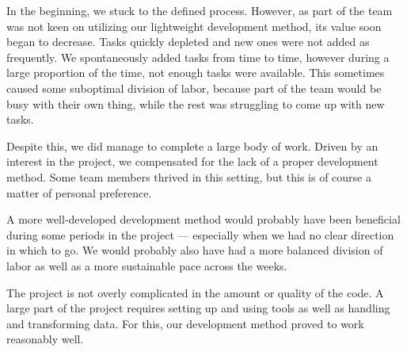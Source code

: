 In the beginning, we stuck to the defined process. However, as part of the team was not keen on utilizing our lightweight development method, its value soon began to decrease. Tasks quickly depleted and new ones were not added as frequently. We spontaneously added tasks from time to time, however during a large proportion of the time, not enough tasks were available. This sometimes caused some suboptimal division of labor, because part of the team would be busy with their own thing, while the rest was struggling to come up with new tasks.

Despite this, we did manage to complete a large body of work. Driven by an interest in the project, we compensated for the lack of a proper development method. Some team members thrived in this setting, but this is of course a matter of personal preference.

A more well-developed development method would probably have been beneficial during some periods in the project --- especially when we had no clear direction in which to go. We would probably also have had a more balanced division of labor as well as a more sustainable pace across the weeks.

The project is not overly complicated in the amount or quality of the code. A large part of the project requires setting up and using tools as well as handling and transforming data. For this, our development method proved to work reasonably well. 



